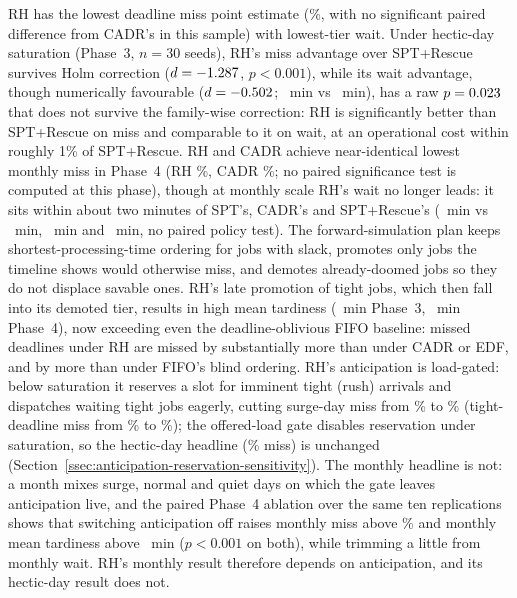 {RH has the lowest deadline miss point estimate (\RHMiss\%, with no significant paired difference from CADR's in this sample) with lowest-tier wait. Under hectic-day saturation (Phase~3, $n=30$ seeds), RH's miss advantage over SPT+Rescue survives Holm correction ($d=-1.287$, $p<0.001$), while its wait advantage, though numerically favourable ($d=-0.502$; \RHWait~min vs \RescueWait~min), has a raw $p=0.023$ that does not survive the family-wise correction: RH is significantly better than SPT+Rescue on miss and comparable to it on wait, at an operational cost within roughly 1\% of SPT+Rescue. RH and CADR achieve near-identical lowest monthly miss in Phase~4 (RH \PhFourRHMiss\%, CADR \PhFourCADRMiss\%; no paired significance test is computed at this phase), though at monthly scale RH's wait no longer leads: it sits within about two minutes of SPT's, CADR's and SPT+Rescue's (\PhFourRHWait~min vs \PhFourSPTwait~min, \PhFourCADRwait~min and \PhFourRescueWait~min, no paired policy test). The forward-simulation plan keeps shortest-processing-time ordering for jobs with slack, promotes only jobs the timeline shows would otherwise miss, and demotes already-doomed jobs so they do not displace savable ones. RH's late promotion of tight jobs, which then fall into its demoted tier, results in high mean tardiness (\RHtard~min Phase~3, \PhFourRHtard~min Phase~4), now exceeding even the deadline-oblivious FIFO baseline: missed deadlines under RH are missed by substantially more than under CADR or EDF, and by more than under FIFO's blind ordering. RH's anticipation is load-gated: below saturation it reserves a slot for imminent tight (rush) arrivals and dispatches waiting tight jobs eagerly, cutting surge-day miss from \ResSurgeOffMiss\% to \ResSurgeOnMiss\% (tight-deadline miss from \ResSurgeOffTight\% to \ResSurgeOnTight\%); the offered-load gate disables reservation under saturation, so the hectic-day headline (\ResHecticGateMiss\% miss) is unchanged (Section~\ref{ssec:anticipation-reservation-sensitivity}). The monthly headline is not: a month mixes surge, normal and quiet days on which the gate leaves anticipation live, and the paired Phase~4 ablation over the same ten replications shows that switching anticipation off raises monthly miss above \PhFourRHMiss\% and monthly mean tardiness above \PhFourRHtard~min ($p<0.001$ on both), while trimming a little from monthly wait. RH's monthly result therefore depends on anticipation, and its hectic-day result does not.

}

